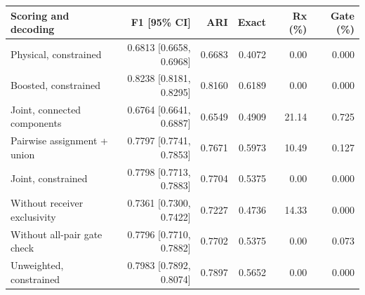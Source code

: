 \begin{tabularx}{\linewidth}{@{}Yrrrrr@{}}
\toprule
Scoring and decoding & F1 [95\% CI] & ARI & Exact & Rx (\%) & Gate (\%) \\
\midrule
Physical, constrained & 0.6813 [0.6658, 0.6968] & 0.6683 & 0.4072 & 0.00 & 0.000 \\
Boosted, constrained & 0.8238 [0.8181, 0.8295] & 0.8160 & 0.6189 & 0.00 & 0.000 \\
Joint, connected components & 0.6764 [0.6641, 0.6887] & 0.6549 & 0.4909 & 21.14 & 0.725 \\
Pairwise assignment + union & 0.7797 [0.7741, 0.7853] & 0.7671 & 0.5973 & 10.49 & 0.127 \\
Joint, constrained & 0.7798 [0.7713, 0.7883] & 0.7704 & 0.5375 & 0.00 & 0.000 \\
Without receiver exclusivity & 0.7361 [0.7300, 0.7422] & 0.7227 & 0.4736 & 14.33 & 0.000 \\
Without all-pair gate check & 0.7796 [0.7710, 0.7882] & 0.7702 & 0.5375 & 0.00 & 0.073 \\
Unweighted, constrained & 0.7983 [0.7892, 0.8074] & 0.7897 & 0.5652 & 0.00 & 0.000 \\
\bottomrule
\end{tabularx}
